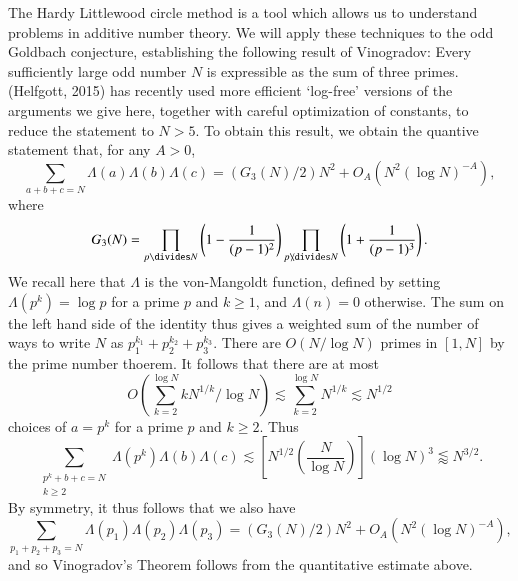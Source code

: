 The Hardy Littlewood circle method is a tool which allows us to understand problems in additive number theory. We will apply these techniques to the odd Goldbach conjecture, establishing the following result of Vinogradov: Every sufficiently large odd number $N$ is expressible as the sum of three primes. (Helfgott, 2015) has recently used more efficient `log-free' versions of the arguments we give here, together with careful optimization of constants, to reduce the statement to $N > 5$. To obtain this result, we obtain the quantive statement that, for any $A > 0$,
%
\[ \sum_{a + b + c = N} \Lambda(a) \Lambda(b) \Lambda(c) = (G_3(N) / 2) N^2 + O_A( N^2 (\log N)^{-A} ), \]
%
where
%
\[ G_3(N) = \prod_{p \divides N} \left( 1 - \frac{1}{(p - 1)^2} \right) \prod_{p \not \divides N} \left( 1 + \frac{1}{(p - 1)^3} \right). \]
%
We recall here that $\Lambda$ is the von-Mangoldt function, defined by setting $\Lambda(p^k) = \log p$ for a prime $p$ and $k \geq 1$, and $\Lambda(n) = 0$ otherwise. The sum on the left hand side of the identity thus gives a weighted sum of the number of ways to write $N$ as $p_1^{k_1} + p_2^{k_2} + p_3^{k_3}$. There are $O(N / \log N)$ primes in $[1,N]$ by the prime number thoerem. It follows that there are at most
%
\[ O \left( \sum_{k = 2}^{\log N} k N^{1/k} / \log N \right) \lesssim \sum_{k = 2}^{\log N} N^{1/k} \lesssim N^{1/2} \]
%
choices of $a = p^k$ for a prime $p$ and $k \geq 2$. Thus
%
\[ \sum_{\substack{p^k + b + c = N\\k \geq 2}} \Lambda(p^k) \Lambda(b) \Lambda(c) \lesssim \left[ N^{1/2} \left( \frac{N}{\log N} \right) \right] (\log N)^3 \lessapprox N^{3/2}.  \]
%
By symmetry, it thus follows that we also have
%
\[ \sum_{p_1 + p_2 + p_3 = N} \Lambda(p_1) \Lambda(p_2) \Lambda(p_3) = (G_3(N) / 2) N^2 + O_A(N^2 (\log N)^{-A}), \]
%
and so Vinogradov's Theorem follows from the quantitative estimate above.

